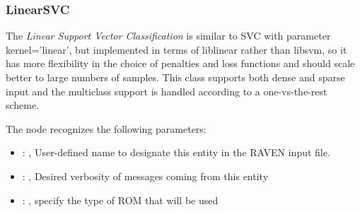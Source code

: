 \subsubsection{LinearSVC}
  The  \textit{Linear Support Vector Classification} is
  similar to SVC with parameter kernel=’linear’, but implemented in terms of liblinear rather than
  libsvm,                             so it has more flexibility in the choice of penalties and loss
  functions and should scale better to large numbers of samples.                             This
  class supports both dense and sparse input and the multiclass support is handled according to a
  one-vs-the-rest scheme.                             

  The  node recognizes the following parameters:
    \begin{itemize}
      \item {}: ,
        User-defined name to designate this entity in the RAVEN input file.
      \item {}: ,
        Desired verbosity of messages coming from this entity
      \item {}: ,
        specify the type of ROM that will be used
  \end{itemize}

